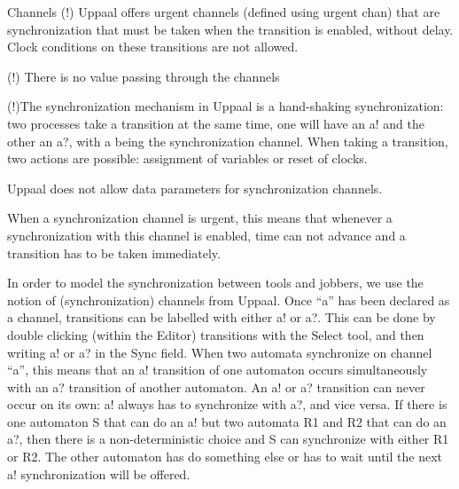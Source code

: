 \documentclass{beamer}
\begin{document}
\begin{frame}{Channels}
	(!)  Uppaal offers urgent channels (defined using urgent chan) that are synchronization that must be taken when the transition is enabled, without delay. Clock conditions on these transitions are not allowed.
	
	(!) There is no value passing through the channels
	
	(!)The synchronization mechanism in Uppaal is a hand-shaking synchronization: two processes take a transition at the same time, one will have an a! and the other an a?, with a being the synchronization channel. When taking a transition, two actions are possible: assignment of variables or reset of clocks. 
	
	Uppaal does not allow
	data parameters for synchronization channels.
	
	When a synchronization channel is urgent, this means that whenever a synchronization with this channel is enabled, time can not advance and a transition has to be taken immediately.\newline
	
	In order to model the synchronization between tools and jobbers,
	we use the notion of (synchronization) channels from Uppaal. Once “a” has been
	declared as a channel, transitions can be labelled with either a! or a?. This can be
	done by double clicking (within the Editor) transitions with the Select tool, and then
	writing a! or a? in the Sync field. When two automata synchronize on channel “a”,
	this means that an a! transition of one automaton occurs simultaneously with an
	a? transition of another automaton. An a! or a? transition can never occur on its
	own: a! always has to synchronize with a?, and vice versa. If there is one automaton
	S that can do an a! but two automata R1 and R2 that can do an a?, then there is
	a non-deterministic choice and S can synchronize with either R1 or R2. The other
	automaton has do something else or has to wait until the next a! synchronization
	will be offered.
\end{frame}
\end{document}
